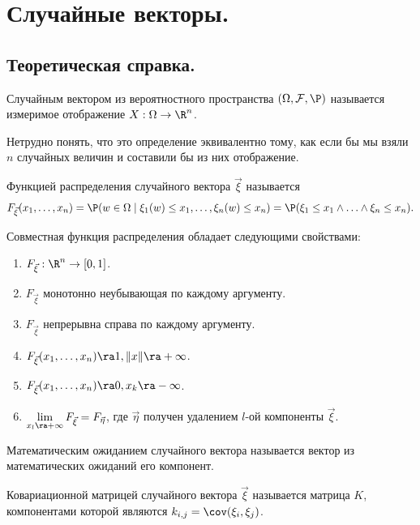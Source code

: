 \section{Случайные векторы.}
\subsection{Теоретическая справка.}
\begin{definition}
    Случайным вектором из вероятностного пространства $(\Omega, \mathcal{F}, \P)$ называется измеримое отображение $X: \Omega \to \R^n$.
\end{definition}
\begin{note}
    Нетрудно понять, что это определение эквивалентно тому, как если бы мы взяли $n$ случайных величин и составили бы из них отображение.
\end{note}
\begin{definition}
    Функцией распределения случайного вектора $\vec{\xi}$ называется
    \[
        F_{\vec{\xi}}(x_1, \ldots, x_n) = \P(w \in \Omega \mid \xi_1(w) \leq x_1, \ldots, \xi_n(w) \leq x_n) = \P(\xi_1 \leq x_1 \wedge \ldots \wedge \xi_n \leq x_n).
    \]
\end{definition}
\begin{proposition}
    Совместная функция распределения обладает следующими свойствами:
    \begin{enumerate}
        \item $F_{\vec{\xi}}: \R^n \to [0, 1]$.
        \item $F_{\vec{\xi}}$ монотонно неубывающая по каждому аргументу.
        \item $F_{\vec{\xi}}$ непрерывна справа по каждому аргументу.
        \item $F_{\vec{\xi}}(x_1, \ldots, x_n) \ra 1, \|x\| \ra +\infty$.
        \item $F_{\vec{\xi}}(x_1, \ldots, x_n) \ra 0, x_k \ra -\infty$.
        \item $\lim\limits_{x_l \ra +\infty} F_{\vec{\xi}} = F_{\vec{\eta}}$, где $\vec{\eta}$ получен удалением $l$-ой компоненты $\vec{\xi}$.
    \end{enumerate}
\end{proposition}
\begin{definition}
    Математическим ожиданием случайного вектора называется вектор из математических ожиданий его компонент.
\end{definition}
\begin{definition}
    Ковариационной матрицей случайного вектора $\vec{\xi}$ называется матрица $K$, компонентами которой являются $k_{i, j} = \cov(\xi_i, \xi_j)$.
\end{definition}
